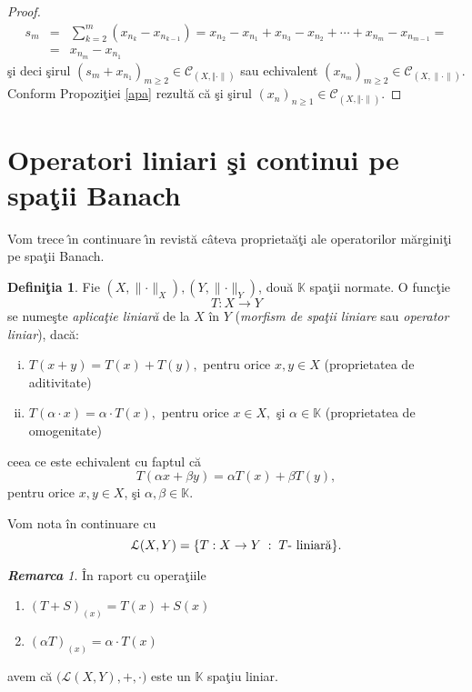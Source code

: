 \documentclass[ a4paper, 12pt]{report}
\theoremstyle{definition}
\newtheorem{definition}{\bf Defini\c tia}[section]
\theoremstyle{remark}
\newtheorem{remarc}{\bf Remarca}[section]
\numberwithin{equation}{section}
\begin{document}
\begin{proof}
\begin{eqnarray*}
s_m &=& \sum\limits_{k=2}^{m}(x_{n_k}-x_{n_{k-1}}) = x_{n_2}-x_{n_1}+x_{n_3}-x_{n_2}+ \cdots+x_{n_m}-x_{n_{m-1}}= \\
&=&x_{n_m}-x_{n_1}
\end{eqnarray*}
\c si deci \c sirul
$(s_m + x_{n_1})_{m \geq 2} \in \mathcal{C}_{(X, \Vert \cdot \rVert)}$ sau echivalent  $(x_{n_m})_{m \geq 2} \in \mathcal{C}_{(X, \lVert \cdot \rVert)}$. Conform Propozi\c tiei \ref{apa} rezult\u a c\u a \c si \c sirul  $(x_n)_{n \geq 1} \in \mathcal{C}_{(X, \Vert \cdot \rVert)}$.
\end{proof}

\newpage

\section{Operatori liniari \c si continui pe spa\c tii Banach}

Vom trece \^\i n continuare \^\i n revist\u a c\^ ateva proprieta\u a\c ti ale operatorilor m\u argini\c ti pe spa\c tii Banach.


\begin{definition}
Fie $(X,\lVert \cdot \rVert_{X}), (Y,\lVert \cdot \rVert_{Y})$, dou\u a $\mathbb{K}$ spa\c tii normate.
O func\c tie
$$T : X \rightarrow Y$$ se nume\c ste {\it aplica\c tie liniar\u a} de la $X$ \^in $Y$ ({\it morfism de spa\c tii liniare} sau {\it operator liniar}), dac\u a:
\begin{enumerate}[(i)]
\item $T(x+y) = T(x) + T(y),$ pentru orice $x,y \in X$ (proprietatea de aditivitate)
\item $T(\alpha \cdot x) = \alpha \cdot T(x),$ pentru orice $x \in X,$ \c si $\alpha \in \mathbb{K}$ (proprietatea de omogenitate)
\end{enumerate}
ceea ce este echivalent cu faptul c\u a $$T(\alpha x + \beta y) = \alpha T(x) + \beta T(y),$$ pentru orice $x,y \in X$, \c si $\alpha, \beta \in \mathbb{K}.$
\end{definition}

Vom nota \^in continuare cu
$$\mathcal{L}(X,Y) = \{ T: X \rightarrow Y\; : \; T \hbox{- liniar\u a} \}.$$

\begin{remarc}
\^In raport cu opera\c tiile
\begin{enumerate}
\item $(T+S)_{(x)} = T(x) + S(x)$
\item $(\alpha T)_{(x)} = \alpha \cdot T(x)$
\end{enumerate}
avem c\u a $\Big( \mathcal{L}(X,Y), + , \cdot\Big)$ este un $\mathbb{K}$ spa\c tiu liniar.
\end{remarc}
\end{document}
